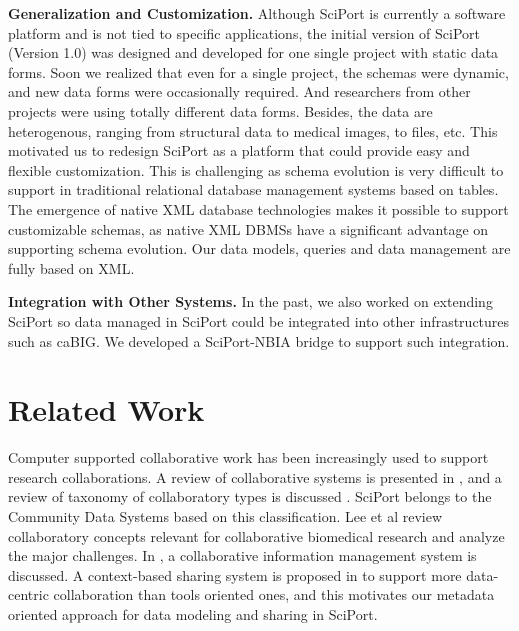 \documentclass{doublecol-new}
\theoremstyle{TH}{
\newtheorem{lemma}{Lemma}
\newtheorem{theorem}[lemma]{Theorem}
\newtheorem{corrolary}[lemma]{Corrolary}
\newtheorem{conjecture}[lemma]{Conjecture}
\newtheorem{proposition}[lemma]{Proposition}
\newtheorem{claim}[lemma]{Claim}
\newtheorem{stheorem}[lemma]{Wrong Theorem}
\newtheorem{algorithm}{Algorithm}
}
\theoremstyle{THrm}{
\newtheorem{definition}{Definition}[section]
\newtheorem{question}{Question}[section]
\newtheorem{remark}{Remark}
\newtheorem{scheme}{Scheme}
}
\theoremstyle{THhit}{
\newtheorem{case}{Case}[section]
}
\begin{document}
\textbf{Generalization and Customization.} Although SciPort is
currently a software platform and is not tied to specific
applications, the initial version of SciPort (Version 1.0) was
designed and developed for one single project with static data
forms. Soon we realized that even for a single project, the schemas
were dynamic, and new data forms were occasionally required. And
researchers from other projects were using totally different data
forms. Besides, the data are heterogenous, ranging from structural
data to medical images, to  files, etc. This motivated us to
redesign SciPort as a platform that could provide easy and flexible
customization. This is challenging as schema evolution is very
difficult to support in traditional relational database management
systems based on tables. The emergence of native XML database
technologies makes it possible to support customizable schemas, as
native XML DBMSs have a significant advantage on supporting schema
evolution. Our data models, queries and data management are fully
based on XML.

\textbf{Integration with Other Systems.} In the past, we also worked
on extending SciPort so data managed in SciPort could be integrated
into other infrastructures such as caBIG. We developed a
SciPort-NBIA \cite{nbia} bridge to support such integration.


\section{Related Work}

Computer supported collaborative work has been increasingly used to
support research collaborations. A review of collaborative systems
is presented in \cite{bafoutsou2002281}, and a review of taxonomy of
collaboratory types is discussed \cite{zimmerman07taxonomy}. SciPort
belongs to the Community Data Systems based on this classification.
Lee et al review collaboratory concepts relevant for collaborative
biomedical research \cite{lee09} and analyze the major challenges.
In \cite{myneni10col}, a collaborative information management system
is discussed.  A context-based sharing system is proposed in
\cite{chin04context} to support more data-centric collaboration than
tools oriented ones, and this motivates our metadata oriented
approach for data modeling and sharing in SciPort.
\end{document}
